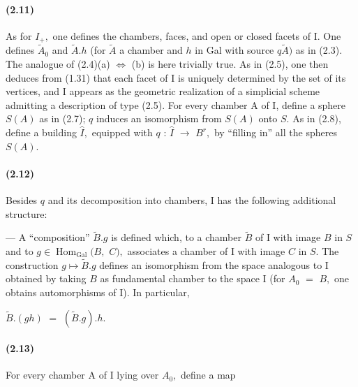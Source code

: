 \documentclass[10pt,a4paper]{article}
\begin{document}
\paragraph{(2.11)} As for \ensuremath{I_+,} one defines the chambers, faces, and open or closed facets of I. One defines \ensuremath{\widetilde{A}_0} and \ensuremath{\widetilde{A}.h} (for \ensuremath{\widetilde{A}} a chamber and \ensuremath{h} in Gal with source \ensuremath{q\widetilde{A})} as in (2.3). The analogue of (2.4)(a) \ensuremath{\Longleftrightarrow} (b) is here trivially true. As in (2.5), one then deduces from (1.31) that each facet of I is uniquely determined by the set of its vertices, and I appears as the geometric realization of a simplicial scheme admitting a description of type (2.5). For every chamber A of I, define a sphere \ensuremath{S(A)} as in (2.7); \ensuremath{q} induces an isomorphism from \ensuremath{S(A)} onto \ensuremath{S.} As in (2.8), define a building \ensuremath{\widehat{I},} equipped with \ensuremath{q} : \ensuremath{\widehat{I}} \ensuremath{\longrightarrow{}} \ensuremath{B^r,} by ``filling in'' all the spheres \ensuremath{S(A).}

\paragraph{(2.12)} Besides \ensuremath{q} and its decomposition into chambers, I has the following additional structure:

--- A ``composition'' \ensuremath{\widetilde{B}.g} is defined which, to a chamber \ensuremath{\widetilde{B}} of I with image \ensuremath{B} in \ensuremath{S} and to \ensuremath{g\in{}\operatorname{Hom}_{\operatorname{Gal}}(B,} \ensuremath{C),} associates a chamber of I with image \ensuremath{C} in \ensuremath{S.} The construction \ensuremath{g\longmapsto{}\widetilde{B}.g} defines an isomorphism from the space analogous to I obtained by taking \ensuremath{B} as fundamental chamber to the space I (for \ensuremath{A_0} \ensuremath{=} \ensuremath{B,} one obtains automorphisms of I). In particular,\par

\ensuremath{\widetilde{B}.(gh)} \ensuremath{=} \ensuremath{(\widetilde{B}.g).h.}\par

\paragraph{(2.13)} For every chamber A of I lying over \ensuremath{A_0,} define a map
\end{document}
